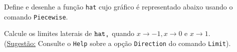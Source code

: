 \documentclass[11pt]{article}
\begin{document}
\begin{itemize}
\medskip



\noindent   Define e desenhe  a fun\c{c}\~ao \texttt{hat} cujo gr\'afico \'e representado abaixo usando o comando \texttt{Piecewise}.


 
   \begin{center}
 \end{center}
 Calcule os limites laterais de $\texttt{hat}\texttt{\char"0D}$ quando  $x\rightarrow -1,  x\rightarrow 0$ e $x\rightarrow 1$. 
 \vspace{2mm}\\ 
 (\underline{Sugest\~ao:} Consulte o \texttt{Help} sobre a op\c{c}\~ao \texttt{Direction} do comando \texttt{Limit}). 




\end{itemize}



 
\end{document}
